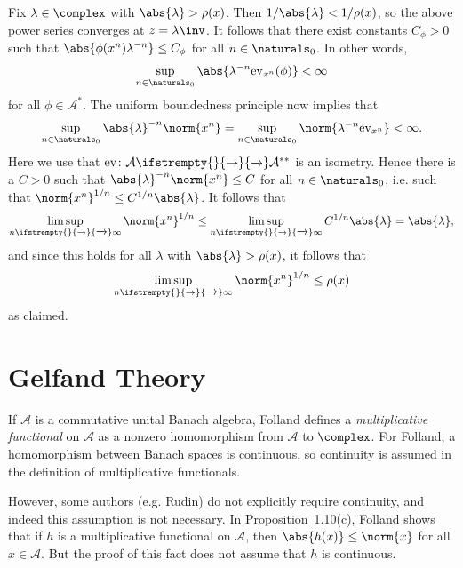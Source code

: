 \documentclass[article, a4paper, 11pt, oneside]{memoir}
\numberwithin{equation}{chapter}
\newcommand{\calA}{\mathcal{A}}
\renewcommand\to[1][]{%
    \ifstrempty{#1}{%
        \rightarrow
    }{%
        \xrightarrow[#1]{}
    }%
}
\begin{document}
\begin{remark}
    Fix $\lambda \in \complex$ with $\abs{\lambda} > \rho(x)$. Then $1/\abs{\lambda} < 1/\rho(x)$, so the above power series converges at $z = \lambda\inv$. It follows that there exist constants $C_\phi > 0$ such that $\abs{\phi(x^n)\lambda^{-n}} \leq C_\phi$ for all $n \in \naturals_0$. In other words,
    \begin{equation*}
        \sup_{n\in\naturals_0} \abs{\lambda^{-n}\ev_{x^n}(\phi)}
            < \infty
    \end{equation*}
    for all $\phi \in \calA^*$. The uniform boundedness principle now implies that
    \begin{equation*}
        \sup_{n\in\naturals_0} \abs{\lambda}^{-n} \norm{x^n}
            = \sup_{n\in\naturals_0} \norm{\lambda^{-n}\ev_{x^n}}
            < \infty.
    \end{equation*}
    Here we use that $\ev \colon \calA \to \calA^{**}$ is an isometry. Hence there is a $C > 0$ such that $\abs{\lambda}^{-n} \norm{x^n} \leq C$ for all $n \in \naturals_0$, i.e. such that $\norm{x^n}^{1/n} \leq C^{1/n} \abs{\lambda}$. It follows that
    \begin{equation*}
        \limsup_{n\to\infty} \norm{x^n}^{1/n}
            \leq \limsup_{n\to\infty} C^{1/n} \abs{\lambda}
            = \abs{\lambda},
    \end{equation*}
    and since this holds for all $\lambda$ with $\abs{\lambda} > \rho(x)$, it follows that
    \begin{equation*}
        \limsup_{n\to\infty} \norm{x^n}^{1/n} \leq \rho(x)
    \end{equation*}
    as claimed.
\end{remark}


\section{Gelfand Theory}

\begin{remark}
    If $\calA$ is a commutative unital Banach algebra, Folland defines a \emph{multiplicative functional} on $\calA$ as a nonzero homomorphism from $\calA$ to $\complex$. For Folland, a homomorphism between Banach spaces is continuous, so continuity is assumed in the definition of multiplicative functionals.

    However, some authors (e.g. Rudin) do not explicitly require continuity, and indeed this assumption is not necessary. In Proposition~1.10(c), Folland shows that if $h$ is a multiplicative functional on $\calA$, then $\abs{h(x)} \leq \norm{x}$ for all $x \in \calA$. But the proof of this fact does not assume that $h$ is continuous.
\end{remark}
\end{document}
